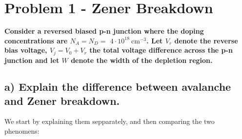 \section{Problem 1 - Zener Breakdown}

\textbf{Consider a reversed biased p-n junction where the doping concentrations are $N_A=N_D=$ $4 \cdot 10^{18} \mathrm{~cm}^{-3}$. Let $V_r$ denote the reverse bias voltage, $V_j=V_0+V_r$ the total voltage difference across the p-n junction and let $W$ denote the width of the depletion region.}
\subsection*{a) Explain the difference between avalanche and Zener breakdown.}
We start by explaining them sepparately, and then comparing the two phenomens:

